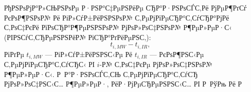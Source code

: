  РђРЅРѕРјР°Р»СЊРЅРѕРµ Р·РЅР°С‡РµРЅРёРµ СЂР°Р·РЅРѕСЃС‚Рё РјРµР¶РґСѓ РєРѕР¶РЅРѕР№ Рё РіР»СѓР±РёРЅРЅРѕР№ С‚РµРјРїРµСЂР°С‚СѓСЂР°РјРё С‚РѕС‡РєРё РїРѕСЂР°Р¶РµРЅРЅРѕР№ РјРѕР»РѕС‡РЅРѕР№ Р¶РµР»РµР·С‹ (РІРЅСѓС‚СЂРµРЅРЅРёР№ РіСЂР°РґРёРµРЅС‚):
        \[t_{i, MW}-t_{i, IR},\]
        РіРґРµ \(t_{i, MW}\) --- РіР»СѓР±РёРЅРЅС‹Рµ Рё \(t_{i, IR}\) --- РєРѕР¶РЅС‹Рµ С‚РµРјРїРµСЂР°С‚СѓСЂС‹ РІ $i$-Р№ С‚РѕС‡РєРµ РјРѕР»РѕС‡РЅРѕР№ Р¶РµР»РµР·С‹.
        Р Р°Р·РЅРѕСЃС‚СЊ С‚РµРјРїРµСЂР°С‚СѓСЂ РјРѕР»РѕС‡РЅС‹С… Р¶РµР»РµР·, РёР·РјРµСЂРµРЅРЅС‹С… РІ Р РўРњ Рё Р